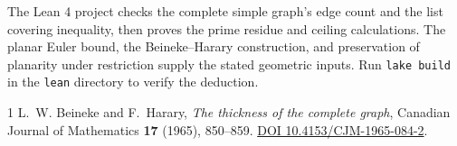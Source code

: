 \documentclass[10pt]{article}
\begin{document}
The Lean 4 project checks the complete simple graph's edge count and the
list covering inequality, then proves the prime residue and ceiling
calculations. The planar Euler bound, the Beineke--Harary construction,
and preservation of planarity under restriction supply the stated
geometric inputs. Run \texttt{lake build} in the \texttt{lean} directory
to verify the deduction.

\begin{thebibliography}{1}
L.~W. Beineke and F.~Harary, \emph{The thickness of the complete graph},
Canadian Journal of Mathematics \textbf{17} (1965), 850--859.
\href{https://doi.org/10.4153/CJM-1965-084-2}{DOI 10.4153/CJM-1965-084-2}.
\end{thebibliography}
\end{document}
